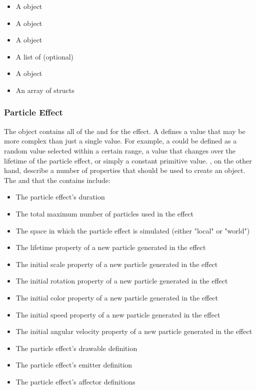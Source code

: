\begin{itemize}[nolistsep,topsep=10pt]
	\item A  object
	\item A  object
	\item A  object
	\item A list of  (optional)
	\item A  object
	\item An array of  structs
\end{itemize}

\subsubsection{Particle Effect}

The  object contains all of the  and  for the effect. A  defines a value that may be more complex than just a single value. For example, a  could be defined as a random value selected within a certain range, a value that changes over the lifetime of the particle effect, or simply a constant primitive value. , on the other hand, describe a number of properties that should be used to create an object. The  and  that the  contains include:

\begin{itemize}[nolistsep,topsep=10pt]
	\item The particle effect's duration
	\item The total maximum number of particles used in the effect
	\item The space in which the particle effect is simulated (either "local" or "world")
	\item The lifetime property of a new particle generated in the effect
	\item The initial scale property of a new particle generated in the effect
	\item The initial rotation property of a new particle generated in the effect
	\item The initial color property of a new particle generated in the effect
	\item The initial speed property of a new particle generated in the effect
	\item The initial angular velocity property of a new particle generated in the effect
	\item The particle effect's drawable definition
	\item The particle effect's emitter definition
	\item The particle effect's affector definitions
\end{itemize}


